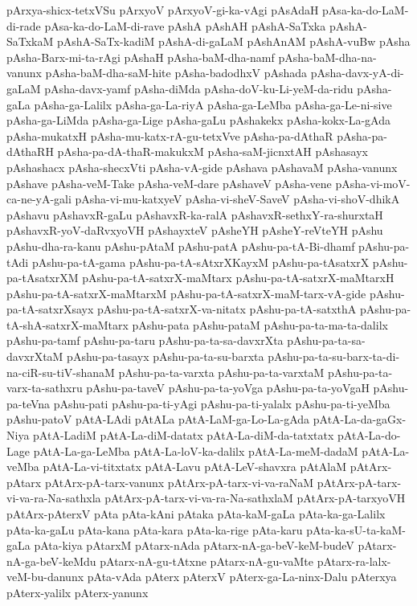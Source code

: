 {pArxya-shicx-tetxVSu
pArxyoV
pArxyoV-gi-ka-vAgi
pAsAdaH
pAsa-ka-do-LaM-di-rade
pAsa-ka-do-LaM-di-rave
pAshA
pAshAH
pAshA-SaTxka
pAshA-SaTxkaM
pAshA-SaTx-kadiM
pAshA-di-gaLaM
pAshAnAM
pAshA-vuBw
pAsha
pAsha-Barx-mi-ta-rAgi
pAshaH
pAsha-baM-dha-namf
pAsha-baM-dha-na-vanunx
pAsha-baM-dha-saM-hite
pAsha-badodhxV
pAshada
pAsha-davx-yA-di-gaLaM
pAsha-davx-yamf
pAsha-diMda
pAsha-doV-ku-Li-yeM-da-ridu
pAsha-gaLa
pAsha-ga-Lalilx
pAsha-ga-La-riyA
pAsha-ga-LeMba
pAsha-ga-Le-ni-sive
pAsha-ga-LiMda
pAsha-ga-Lige
pAsha-gaLu
pAshakekx
pAsha-kokx-La-gAda
pAsha-mukatxH
pAsha-mu-katx-rA-gu-tetxVve
pAsha-pa-dAthaR
pAsha-pa-dAthaRH
pAsha-pa-dA-thaR-makukxM
pAsha-saM-jicnxtAH
pAshasayx
pAshashacx
pAsha-shecxVti
pAsha-vA-gide
pAshava
pAshavaM
pAsha-vanunx
pAshave
pAsha-veM-Take
pAsha-veM-dare
pAshaveV
pAsha-vene
pAsha-vi-moV-ca-ne-yA-gali
pAsha-vi-mu-katxyeV
pAsha-vi-sheV-SaveV
pAsha-vi-shoV-dhikA
pAshavu
pAshavxR-gaLu
pAshavxR-ka-ralA
pAshavxR-sethxY-ra-shurxtaH
pAshavxR-yoV-daRvxyoVH
pAshayxteV
pAsheYH
pAsheY-reVteYH
pAshu
pAshu-dha-ra-kanu
pAshu-pAtaM
pAshu-patA
pAshu-pa-tA-Bi-dhamf
pAshu-pa-tAdi
pAshu-pa-tA-gama
pAshu-pa-tA-sAtxrXKayxM
pAshu-pa-tAsatxrX
pAshu-pa-tAsatxrXM
pAshu-pa-tA-satxrX-maMtarx
pAshu-pa-tA-satxrX-maMtarxH
pAshu-pa-tA-satxrX-maMtarxM
pAshu-pa-tA-satxrX-maM-tarx-vA-gide
pAshu-pa-tA-satxrXsayx
pAshu-pa-tA-satxrX-va-nitatx
pAshu-pa-tA-satxthA
pAshu-pa-tA-shA-satxrX-maMtarx
pAshu-pata
pAshu-pataM
pAshu-pa-ta-ma-ta-dalilx
pAshu-pa-tamf
pAshu-pa-taru
pAshu-pa-ta-sa-davxrXta
pAshu-pa-ta-sa-davxrXtaM
pAshu-pa-tasayx
pAshu-pa-ta-su-barxta
pAshu-pa-ta-su-barx-ta-di-na-ciR-su-tiV-shanaM
pAshu-pa-ta-varxta
pAshu-pa-ta-varxtaM
pAshu-pa-ta-varx-ta-sathxru
pAshu-pa-taveV
pAshu-pa-ta-yoVga
pAshu-pa-ta-yoVgaH
pAshu-pa-teVna
pAshu-pati
pAshu-pa-ti-yAgi
pAshu-pa-ti-yalalx
pAshu-pa-ti-yeMba
pAshu-patoV
pAtA-LAdi
pAtALa
pAtA-LaM-ga-Lo-La-gAda
pAtA-La-da-gaGx-Niya
pAtA-LadiM
pAtA-La-diM-datatx
pAtA-La-diM-da-tatxtatx
pAtA-La-do-Lage
pAtA-La-ga-LeMba
pAtA-La-loV-ka-dalilx
pAtA-La-meM-dadaM
pAtA-La-veMba
pAtA-La-vi-titxtatx
pAtA-Lavu
pAtA-LeV-shavxra
pAtAlaM
pAtArx-pAtarx
pAtArx-pA-tarx-vanunx
pAtArx-pA-tarx-vi-va-raNaM
pAtArx-pA-tarx-vi-va-ra-Na-sathxla
pAtArx-pA-tarx-vi-va-ra-Na-sathxlaM
pAtArx-pA-tarxyoVH
pAtArx-pAterxV
pAta
pAta-kAni
pAtaka
pAta-kaM-gaLa
pAta-ka-ga-Lalilx
pAta-ka-gaLu
pAta-kana
pAta-kara
pAta-ka-rige
pAta-karu
pAta-ka-sU-ta-kaM-gaLa
pAta-kiya
pAtarxM
pAtarx-nAda
pAtarx-nA-ga-beV-keM-budeV
pAtarx-nA-ga-beV-keMdu
pAtarx-nA-gu-tAtxne
pAtarx-nA-gu-vaMte
pAtarx-ra-lalx-veM-bu-danunx
pAta-vAda
pAterx
pAterxV
pAterx-ga-La-ninx-Dalu
pAterxya
pAterx-yalilx
pAterx-yanunx
}
